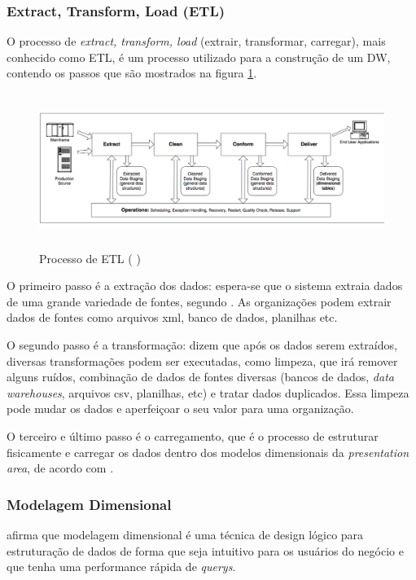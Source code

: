 \subsubsection{Extract, Transform, Load (ETL)}
O processo de \textit{extract, transform, load} (extrair, transformar, carregar), mais conhecido como ETL, é um processo utilizado para a construção de um DW, contendo os passos que são mostrados na figura \ref{etl}. 
\begin{figure}[H]
\centering
\includegraphics[height=5cm]{imagens/dw_process.png}
\caption{Processo de ETL (\citeauthor{kimball2004} \citeyear{kimball2004})}
\label{etl}
\end{figure}
O primeiro passo é a extração dos dados: espera-se que o sistema extraia dados de uma grande variedade de fontes, segundo . As organizações podem extrair dados de fontes como arquivos xml, banco de dados, planilhas etc.

O segundo passo é a transformação:  dizem que após os dados serem extraídos, diversas transformações podem ser executadas, como limpeza, que irá remover alguns ruídos, combinação de dados de fontes diversas (bancos de dados, \textit{data warehouses}, arquivos csv, planilhas, etc) e tratar dados duplicados. Essa limpeza pode mudar os dados e aperfeiçoar o seu valor para uma organização.

O terceiro e último passo é o carregamento, que é o processo de estruturar fisicamente e carregar os dados dentro dos modelos dimensionais da \textit{presentation area}, de acordo com .

\subsubsection{Modelagem Dimensional}
 afirma que modelagem dimensional é uma técnica de design lógico para estruturação de dados de forma que seja intuitivo para os usuários do negócio e que tenha uma performance rápida de \textit{querys}.

